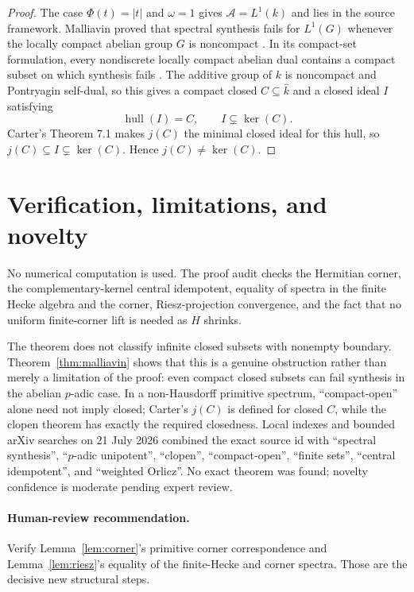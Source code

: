 \documentclass[11pt]{article}
\newcommand{\A}{\mathcal A}
\newcommand{\hull}{\operatorname{hull}}
\begin{document}
\begin{proof}
The case $\Phi(t)=|t|$ and $\omega=1$ gives $\A=L^1(k)$ and lies in the
source framework.  Malliavin proved that spectral synthesis fails for
$L^1(G)$ whenever the locally compact abelian group $G$ is noncompact
\cite{Malliavin}.  In its compact-set formulation, every nondiscrete locally
compact abelian dual contains a compact subset on which synthesis fails
\cite[p.~358]{deLeeuwMirkil}.  The additive group of $k$ is noncompact and
Pontryagin self-dual, so this gives a compact closed
$C\subseteq\widehat{k}$ and a closed ideal $I$ satisfying
\[
 \hull(I)=C,\qquad I\subsetneq\ker(C).
\]
Carter's Theorem 7.1 makes $j(C)$ the minimal closed ideal for this hull, so
$j(C)\subseteq I\subsetneq\ker(C)$.  Hence $j(C)\ne\ker(C)$.
\end{proof}

\section{Verification, limitations, and novelty}

No numerical computation is used.  The proof audit checks the Hermitian
corner, the complementary-kernel central idempotent, equality of spectra in
the finite Hecke algebra and the corner, Riesz-projection convergence, and
the fact that no uniform finite-corner lift is needed as $H$ shrinks.

The theorem does not classify infinite closed subsets with nonempty boundary.
Theorem~\ref{thm:malliavin} shows that this is a genuine obstruction rather
than merely a limitation of the proof: even compact closed subsets can fail
synthesis in the abelian $p$-adic case.
In a non-Hausdorff primitive spectrum, ``compact-open'' alone need not imply
closed; Carter's $j(C)$ is defined for closed $C$, while the clopen theorem
has exactly the required closedness.  Local indexes and bounded arXiv searches
on 21 July 2026 combined the exact source id with ``spectral synthesis'',
``$p$-adic unipotent'', ``clopen'', ``compact-open'', ``finite sets'',
``central idempotent'', and ``weighted Orlicz''.  No exact theorem was found;
novelty confidence is moderate pending expert review.

\paragraph{Human-review recommendation.}
Verify Lemma~\ref{lem:corner}'s primitive corner correspondence and
Lemma~\ref{lem:riesz}'s equality of the finite-Hecke and corner spectra.
Those are the decisive new structural steps.
\end{document}
